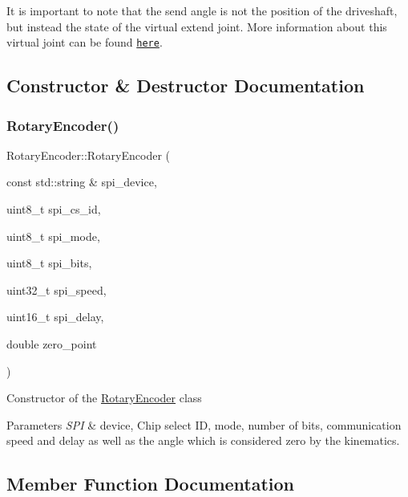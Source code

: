 It is important to note that the send angle is not the position of the driveshaft, but instead the state of the virtual extend joint. More information about this virtual joint can be found \href{https://github.com/TriPed-Robot/TriPed-Reference-Document}{\tt here}. 

\subsection{Constructor \& Destructor Documentation}
\mbox{\label{classRotaryEncoder_a4a133815faa29f99d2a2e53b8568a411}} 
\subsubsection{\texorpdfstring{Rotary\+Encoder()}{RotaryEncoder()}}
{\footnotesize\ttfamily Rotary\+Encoder\+::\+Rotary\+Encoder (\begin{DoxyParamCaption}\item[{const std\+::string \&}]{spi\+\_\+device,  }\item[{uint8\+\_\+t}]{spi\+\_\+cs\+\_\+id,  }\item[{uint8\+\_\+t}]{spi\+\_\+mode,  }\item[{uint8\+\_\+t}]{spi\+\_\+bits,  }\item[{uint32\+\_\+t}]{spi\+\_\+speed,  }\item[{uint16\+\_\+t}]{spi\+\_\+delay,  }\item[{double}]{zero\+\_\+point }\end{DoxyParamCaption})}

Constructor of the \hyperlink{classRotaryEncoder}{Rotary\+Encoder} class 
\begin{DoxyParams}{Parameters}
{\em S\+PI} & device, Chip select ID, mode, number of bits, communication speed and delay as well as the angle which is considered zero by the kinematics. \\
\hline
\end{DoxyParams}


\subsection{Member Function Documentation}
\mbox{\label{classRotaryEncoder_adf89df36f38d0ee87b454f22c25a85f0}} 
